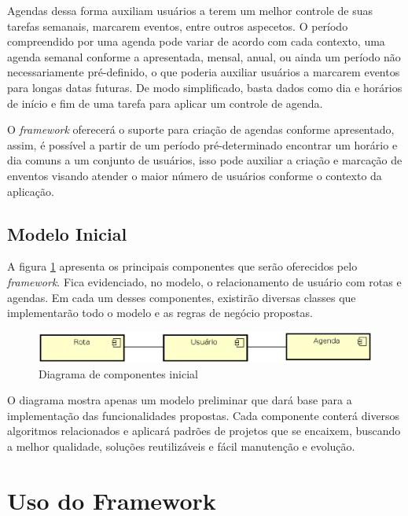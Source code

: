 Agendas dessa forma auxiliam usuários a terem um melhor controle de suas tarefas semanais, marcarem eventos, entre outros aspecetos. O período compreendido por uma agenda pode variar de acordo com cada contexto, uma agenda semanal conforme a apresentada, mensal, anual, ou ainda um período não necessariamente pré-definido, o que poderia auxiliar usuários a marcarem eventos para longas datas futuras. De modo simplificado, basta dados como dia e horários de início e fim de uma tarefa para aplicar um controle de agenda.

O \textit{framework} oferecerá o suporte para criação de agendas conforme apresentado, assim, é possível a partir de um período pré-determinado encontrar um horário e dia comuns a um conjunto de usuários, isso pode auxiliar a criação e marcação de enventos visando atender o maior número de usuários conforme o contexto da aplicação.

\subsection{Modelo Inicial}

A figura \ref{diagrama de componentes} apresenta os principais componentes que serão oferecidos pelo \textit{framework}. Fica evidenciado, no modelo, o relacionamento de usuário com rotas e agendas. Em cada um desses componentes, existirão diversas classes que implementarão todo o modelo e as regras de negócio propostas.

\begin{figure}[!h]
	\centering
	\includegraphics[scale=0.55]{figuras/capitulo5/diagrama_componentes.eps}
	\caption{Diagrama de componentes inicial}
	\label{diagrama de componentes}
\end{figure}

O diagrama mostra apenas um modelo preliminar que dará base para a implementação das funcionalidades propostas. Cada componente conterá diversos algoritmos relacionados e aplicará padrões de projetos que se encaixem, buscando a melhor qualidade, soluções reutilizáveis e fácil manutenção e evolução.

\section{Uso do Framework}

